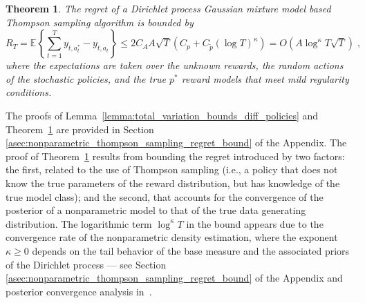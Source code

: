 \documentclass{article}
\newtheorem{theorem}{Theorem}
\newcommand{\eValue}[2]{\mathbb{E}_{#1}\left\{ #2 \right\}}
\newcommand{\astar}{a^*}
\newcommand{\pstar}{p^*}
\newcommand{\ptilde}{\tilde{p}}
\newcommand{\ie}{i.e., }
\begin{document}
\begin{theorem}
	The regret of a Dirichlet process Gaussian mixture model based Thompson sampling algorithm is bounded by
	\begin{equation}
	R_T	=\eValue{}{\sum_{t=1}^T y_{t,\astar_t}-y_{t,a_t} } \leq 2 C_A A \sqrt{T} (C_p + C_{\ptilde} (\log T)^\kappa ) = O(A \log^\kappa T \sqrt{T}) \; ,
	\nonumber
	\end{equation}
	where the expectations are taken over the unknown rewards, the random actions of the stochastic policies, and the true $\pstar$ reward models that meet mild regularity conditions. 
	\label{th:regret_bound}
\end{theorem}
The proofs of Lemma~\ref{lemma:total_variation_bounds_diff_policies} and Theorem~\ref{th:regret_bound} are provided in Section \ref{asec:nonparametric_thompson_sampling_regret_bound} of the Appendix. The proof of Theorem~\ref{th:regret_bound} results from bounding the regret introduced by two factors: the first, related to the use of Thompson sampling (\ie a policy that does not know the true parameters of the reward distribution, but has knowledge of the true model class); and the second, that accounts for the convergence of the posterior of a nonparametric model to that of the true data generating distribution. The logarithmic term $\log^\kappa T$ in the bound appears due to the convergence rate of the nonparametric density estimation, where the exponent $\kappa\geq 0$ depends on the tail behavior of the base measure and the associated priors of the Dirichlet process --- see Section \ref{asec:nonparametric_thompson_sampling_regret_bound} of the Appendix and posterior convergence analysis in~\cite{j-Ghosal2001,j-Ghosal2007}.
\end{document}
